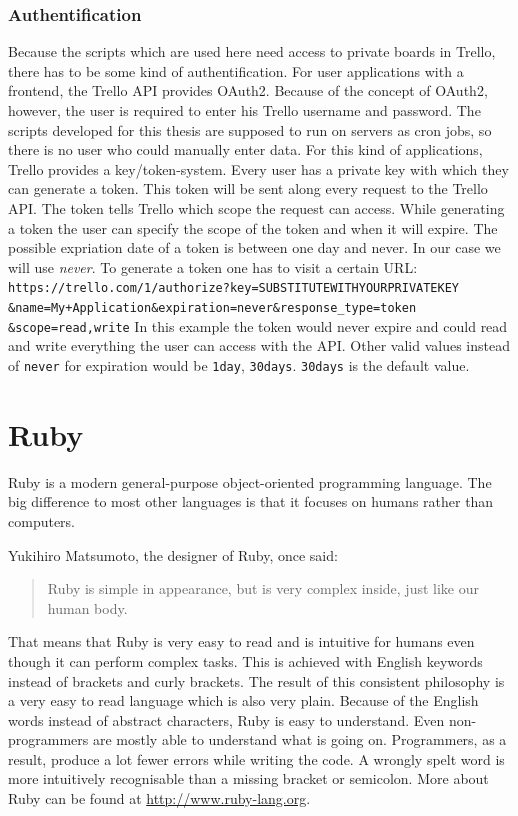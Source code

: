 \subsubsection{Authentification}
Because the scripts which are used here need access to private boards in Trello, there has to be some kind of authentification. For user applications with a frontend, the Trello API provides OAuth2. Because of the concept of OAuth2, however, the user is required to enter his Trello username and password. \cite{oauth} The scripts developed for this thesis are supposed to run on servers as cron jobs, so there is no user who could manually enter data. For this kind of applications, Trello provides a key/token-system. Every user has a private key with which they can generate a token. This token will be sent along every request to the Trello API. The token tells Trello which scope the request can access. While generating a token the user can specify the scope of the token and when it will expire. The possible expriation date of a token is between one day and never. In our case we will use \emph{never}. To generate a token one has to visit a certain URL:
\texttt{
https://trello.com/1/authorize?key=SUBSTITUTEWITHYOURPRIVATEKEY \&name=My+Application\&expiration=never\&response\_type=token \&scope=read,write}
In this example the token would never expire and could read and write everything the user can access with the API. Other valid values instead of \texttt{never} for expiration would be \texttt{1day}, \texttt{30days}. \texttt{30days} is the default value. \cite{trello:gettingstarted}


\section{Ruby}
Ruby is a modern general-purpose object-oriented programming language. The big difference to most other languages is that it focuses on humans rather than computers. 

Yukihiro Matsumoto, the designer of Ruby, once said:
\begin{quote}
Ruby is simple in appearance, but is very
complex inside, just like our human body.\cite{ruby:talk}
\end{quote}

That means that Ruby is very easy to read and is intuitive for humans even though it can perform complex tasks. This is achieved with English keywords instead of brackets and curly brackets. The result of this consistent philosophy is a very easy to read language which is also very plain. Because of the English words instead of abstract characters, Ruby is easy to understand. Even non-programmers are mostly able to understand what is going on. Programmers, as a result, produce a lot fewer errors while writing the code. A wrongly spelt word is more intuitively recognisable than a missing bracket or semicolon. \cite{ruby:about} More about Ruby can be found at \url{http://www.ruby-lang.org}.

